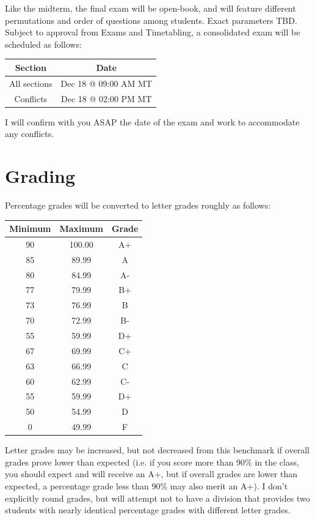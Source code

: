 \documentclass[11pt,]{article}
\begin{document}
Like the midterm, the final exam will be open-book, and will feature different permutations and order of questions among students. Exact parameters TBD. Subject to approval from Exams and Timetabling, a consolidated exam will be scheduled as follows:

\begin{table}[H]
\centering
\begin{tabular}{cc}
\toprule
Section & Date\\
\midrule
All sections & Dec 18 @ 09:00 AM MT\\
Conflicts & Dec 18 @ 02:00 PM MT\\
\bottomrule
\end{tabular}
\end{table}

I will confirm with you ASAP the date of the exam and work to accommodate any conflicts.

\hypertarget{grading}{%
\section{Grading}\label{grading}}

Percentage grades will be converted to letter grades roughly as follows:

\begin{table}[H]
\centering
\begin{tabular}{ccc}
\toprule
Minimum & Maximum & Grade\\
\midrule
90 & 100.00 & A+\\
85 & 89.99 & A\\
80 & 84.99 & A-\\
77 & 79.99 & B+\\
73 & 76.99 & B\\
70 & 72.99 & B-\\
55 & 59.99 & D+\\
67 & 69.99 & C+\\
63 & 66.99 & C\\
60 & 62.99 & C-\\
55 & 59.99 & D+\\
50 & 54.99 & D\\
0 & 49.99 & F\\
\bottomrule
\end{tabular}
\end{table}

Letter grades may be increased, but not decreased from this benchmark if
overall grades prove lower than expected (i.e. if you score more than 90\% in the class, you should expect and will receive an A+, but if overall grades are lower than expected, a percentage grade less than 90\% may also merit an A+). I don't explicitly round grades, but will attempt not to have a division that provides two students with nearly identical percentage grades with different letter grades.
\end{document}
